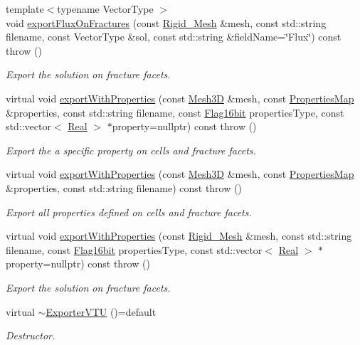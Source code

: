 \begin{DoxyCompactItemize}
{\footnotesize template$<$typename Vector\+Type $>$ }\\void \hyperlink{classFVCode3D_1_1ExporterVTU_a1bca940b11053faa1a928bf3b19709af}{export\+Flux\+On\+Fractures} (const \hyperlink{classFVCode3D_1_1Rigid__Mesh}{Rigid\+\_\+\+Mesh} \&mesh, const std\+::string filename, const Vector\+Type \&sol, const std\+::string \&field\+Name=\char`\"{}Flux\char`\"{}) const   throw ()
\begin{DoxyCompactList}\small\item\em Export the solution on fracture facets. \end{DoxyCompactList}\item 
virtual void \hyperlink{classFVCode3D_1_1ExporterVTU_a12240c4de9e7b3a5bf8f513c873c4547}{export\+With\+Properties} (const \hyperlink{classFVCode3D_1_1Mesh3D}{Mesh3D} \&mesh, const \hyperlink{classFVCode3D_1_1PropertiesMap}{Properties\+Map} \&properties, const std\+::string filename, const \hyperlink{namespaceFVCode3D_a17a9cb86e2e25bbfbfcb645a2eec1d64}{Flag16bit} properties\+Type, const std\+::vector$<$ \hyperlink{namespaceFVCode3D_a40c1f5588a248569d80aa5f867080e83}{Real} $>$ $\ast$property=nullptr) const   throw ()
\begin{DoxyCompactList}\small\item\em Export the a specific property on cells and fracture facets. \end{DoxyCompactList}\item 
virtual void \hyperlink{classFVCode3D_1_1ExporterVTU_a0013b4e717db2c4719b00a5122f7b405}{export\+With\+Properties} (const \hyperlink{classFVCode3D_1_1Mesh3D}{Mesh3D} \&mesh, const \hyperlink{classFVCode3D_1_1PropertiesMap}{Properties\+Map} \&properties, const std\+::string filename) const   throw ()
\begin{DoxyCompactList}\small\item\em Export all properties defined on cells and fracture facets. \end{DoxyCompactList}\item 
virtual void \hyperlink{classFVCode3D_1_1ExporterVTU_a2500450bb97bf68e5a6a5f035b2b775d}{export\+With\+Properties} (const \hyperlink{classFVCode3D_1_1Rigid__Mesh}{Rigid\+\_\+\+Mesh} \&mesh, const std\+::string filename, const \hyperlink{namespaceFVCode3D_a17a9cb86e2e25bbfbfcb645a2eec1d64}{Flag16bit} properties\+Type, const std\+::vector$<$ \hyperlink{namespaceFVCode3D_a40c1f5588a248569d80aa5f867080e83}{Real} $>$ $\ast$property=nullptr) const   throw ()
\begin{DoxyCompactList}\small\item\em Export the solution on fracture facets. \end{DoxyCompactList}\item 
virtual \hyperlink{classFVCode3D_1_1ExporterVTU_a50483218cd7944d4b421156a1e534c32}{$\sim$\+Exporter\+V\+TU} ()=default
\begin{DoxyCompactList}\small\item\em Destructor. \end{DoxyCompactList}\end{DoxyCompactItemize}
